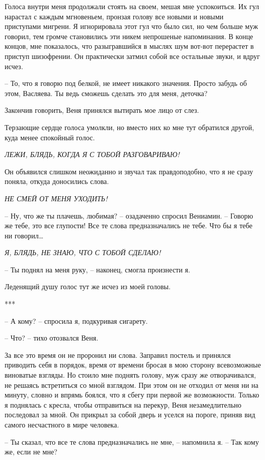 \documentclass[
]{book}
\begin{document}
Голоса внутри меня продолжали стоять на своем, мешая мне успокоиться. Их гул нарастал с каждым мгновеньем, пронзая голову все новыми и новыми приступами мигрени. Я игнорировала этот гул что было сил, но чем больше муж говорил, тем громче становились эти никем непрошеные напоминания. В конце концов, мне показалось, что разыгравшийся в мыслях шум вот-вот перерастет в приступ шизофрении. Он практически затмил собой все остальные звуки, и вдруг исчез.

-- То, что я говорю под белкой, не имеет никакого значения. Просто забудь об этом, Васляева. Ты ведь сможешь сделать это для меня, деточка?

Закончив говорить, Веня принялся вытирать мое лицо от слез.

Терзающие сердце голоса умолкли, но вместо них ко мне тут обратился другой, куда менее спокойный голос.

\emph{ЛЕЖИ, БЛЯДЬ, КОГДА Я С ТОБОЙ РАЗГОВАРИВАЮ! }

Он объявился слишком неожиданно и звучал так правдоподобно, что я не сразу поняла, откуда доносились слова.

\emph{НЕ СМЕЙ ОТ МЕНЯ УХОДИТЬ!}

-- Ну, что же ты плачешь, любимая? -- озадаченно спросил Вениамин. -- Говорю же тебе, это все глупости! Все те слова предназначались не тебе. Что бы я тебе ни говорил\ldots{}

\emph{Я, БЛЯДЬ, НЕ ЗНАЮ, ЧТО С ТОБОЙ СДЕЛАЮ!}

-- Ты поднял на меня руку, -- наконец, смогла произнести я.

Леденящий душу голос тут же исчез из моей головы.

***

-- А кому? -- спросила я, подкуривая сигарету.

-- Что? -- тихо отозвался Веня.

За все это время он не проронил ни слова. Заправил постель и принялся приводить себя в порядок, время от времени бросая в мою сторону всевозможные виноватые взгляды. Но стоило мне поднять голову, муж сразу же отворачивался, не решаясь встретиться со мной взглядом. При этом он не отходил от меня ни на минуту, словно и впрямь боялся, что я сбегу при первой же возможности. Только я поднялась с кресла, чтобы отправиться на перекур, Веня незамедлительно последовал за мной. Он прикрыл за собой дверь и уселся на пороге, приняв вид самого несчастного в мире человека.

-- Ты сказал, что все те слова предназначались не мне, -- напомнила я. -- Так кому же, если не мне?
\end{document}
